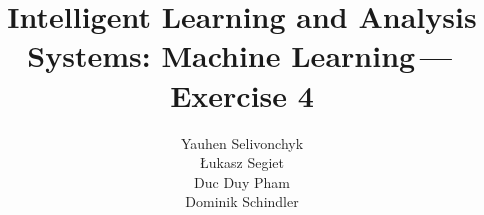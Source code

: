 \documentclass[a4paper]{article}
\newcommand{\exnumber}{4}
\begin{document}
\title{Intelligent Learning and Analysis Systems: Machine Learning\,---\,Exercise \exnumber}
\author{Yauhen Selivonchyk\\ {\L}ukasz Segiet\\Duc Duy Pham\\Dominik Schindler}

\maketitle





\end{document}
